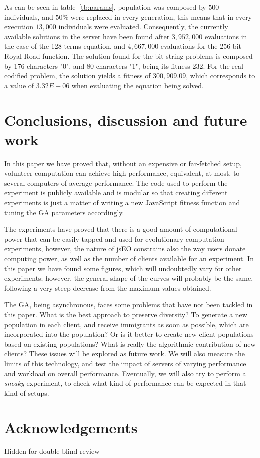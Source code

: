 \documentclass[runningheads,a4paper]{llncs}
\begin{document}
As can be seen in table~\ref{tb:params}, population was composed by $500$ individuals, and $50\%$ were replaced in every generation, this means that in every execution $13,000$ individuals were evaluated. Consequently, the currently available solutions in the server have been found after $3,952,000$ evaluations in the case of the 128-terms equation, and $4,667,000$ evaluations for the 256-bit Royal Road function. The solution found for the bit-string problems is composed by 176 characters "0", and 80 characters "1", being  its fitness 232. For the real codified problem, the solution yields a fitness of $300,909.09$, which corresponds to a value of $3.32E-06$ when evaluating the equation being solved.

\section{Conclusions, discussion and future work}
\label{sec:conc}

In this paper we have proved that, 
without an expensive or far-fetched setup, volunteer computation can achieve high
performance, equivalent, at most, to several computers of average
performance. The code used to perform the experiment is publicly
available and is modular so that creating different experiments is
just a matter of writing a new JavaScript fitness function and tuning
the GA parameters accordingly. 

The experiments have proved that there is a good amount of
computational power that can be easily tapped and used for
evolutionary computation experiments, however, the nature of jsEO
constrains also the way users donate computing power, as well as the
number of clients available for an experiment. In this paper we have
found some figures, which will undoubtedly vary for other experiments;
however, the general shape of the curves will probably be the same,
following a very steep decrease from the maximum values obtained. 

The GA, being asynchronous, faces some problems that have not been
tackled in this paper. What is the best approach to preserve
diversity? To generate a new population in each client, and receive
immigrants as soon as possible, which are incorporated into the
population? Or is it better to create new client populations based on
existing populations? What is really the algorithmic contribution of
new clients? These issues will be explored as future work. 
We will also measure the limits of this technology, and test
the impact of servers of varying performance and workload on overall
performance. Eventually, we will also try to perform a {\em sneaky}
experiment, to check what kind of performance can be expected in that
kind of setups. 

\section*{Acknowledgements}

Hidden for double-blind review





\end{document}
